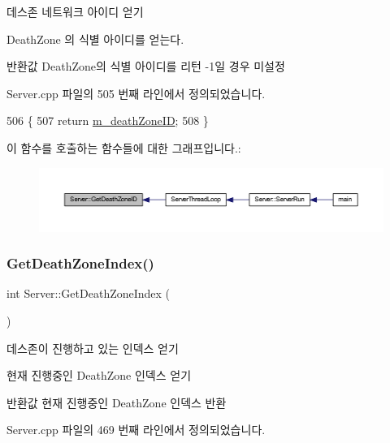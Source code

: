 데스존 네트워크 아이디 얻기 

Death\+Zone 의 식별 아이디를 얻는다.

\begin{DoxyReturn}{반환값}
Death\+Zone의 식별 아이디를 리턴 -\/1일 경우 미설정 
\end{DoxyReturn}


Server.\+cpp 파일의 505 번째 라인에서 정의되었습니다.


\begin{DoxyCode}
506 \{
507     \textcolor{keywordflow}{return} \hyperlink{class_server_a65e72b65d1be2dc79fddb0433402cd81}{m\_deathZoneID};
508 \}
\end{DoxyCode}
이 함수를 호출하는 함수들에 대한 그래프입니다.\+:\nopagebreak
\begin{figure}[H]
\begin{center}
\leavevmode
\includegraphics[width=350pt]{class_server_ad0f632640a71c4d229e17e7b9eb2257d_icgraph}
\end{center}
\end{figure}
\mbox{\label{class_server_a636f3c3d5fe8406197f9ea30409fb725}} 
\subsubsection{\texorpdfstring{Get\+Death\+Zone\+Index()}{GetDeathZoneIndex()}}
{\footnotesize\ttfamily int Server\+::\+Get\+Death\+Zone\+Index (\begin{DoxyParamCaption}{ }\end{DoxyParamCaption})}



데스존이 진행하고 있는 인덱스 얻기 

현재 진행중인 Death\+Zone 인덱스 얻기

\begin{DoxyReturn}{반환값}
현재 진행중인 Death\+Zone 인덱스 반환 
\end{DoxyReturn}


Server.\+cpp 파일의 469 번째 라인에서 정의되었습니다.


